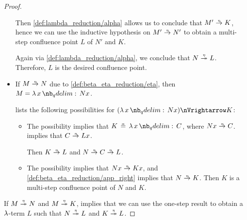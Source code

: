 \begin{proof}
\begin{itemize}
    Then \ref{def:lambda_reduction/alpha} allows us to conclude that \( M' \ered K \), hence we can use the inductive hypothesis on \( M' \ered N' \) to obtain a multi-step confluence point \( L \) of \( N' \) and \( K \).

    Again via \ref{def:lambda_reduction/alpha}, we conclude that \( N \ered* L \). Therefore, \( L \) is the desired confluence point.

    \item If \( M \ered N \) due to \ref{def:beta_eta_reduction/eta}, then \( M = \qabs x N x \).

     lists the following possibilities for \( (\qabs x N x) \pred K \):
    \begin{itemize}
      \item The possibility  implies that \( K \aequiv \qabs x C \), where \( Nx \ered C \).  implies that \( C \ered Lx \).

      Then \( K \ered L \) and \( N \ered C \ered L \).

      \item The possibility  implies that \( N x \ered K x \), and \ref{def:beta_eta_reduction/app_right} implies that \( N \ered K \). Then \( K \) is a multi-step confluence point of \( N \) and \( K \).
    \end{itemize}
  \end{itemize}

   If \( M \ered* N \) and \( M \ered* K \),  implies that we can use the one-step result to obtain a \( \mathrm{\lambda} \)-term \( L \) such that \( N \ered* L \) and \( K \ered* L \).
\end{proof}
